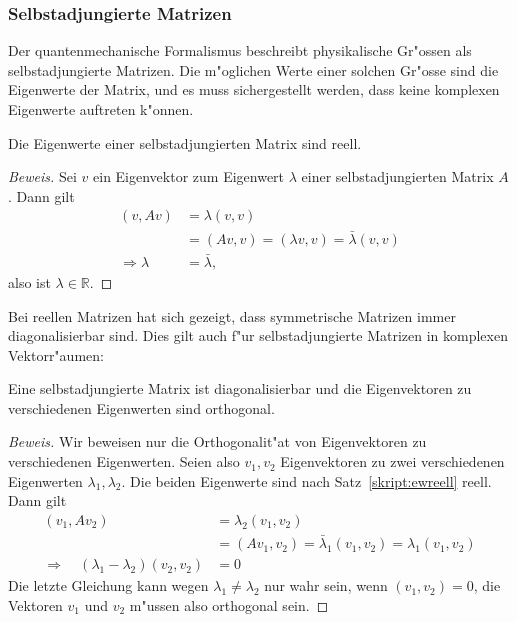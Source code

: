 \subsubsection{Selbstadjungierte Matrizen}
Der quantenmechanische Formalismus beschreibt physikalische Gr"ossen
als selbstadjungierte Matrizen. Die m"oglichen Werte einer solchen Gr"osse
sind die Eigenwerte der Matrix, und es muss sichergestellt werden,
dass keine komplexen Eigenwerte auftreten k"onnen.

\begin{satz}
\label{skript:ewreell}
Die Eigenwerte einer selbstadjungierten Matrix sind reell.
\end{satz}
\begin{proof}[Beweis]
Sei $v$ ein Eigenvektor zum Eigenwert $\lambda$ einer selbstadjungierten
Matrix $A$. Dann gilt
\begin{align*}
(v,Av)
&=
\lambda(v,v)
\\
&=(Av,v)=(\lambda v,v)=\bar\lambda(v,v)
\\
\Rightarrow \lambda&=\bar\lambda,
\end{align*}
also ist $\lambda\in\mathbb R$.
\end{proof}

Bei reellen Matrizen hat sich gezeigt, dass symmetrische Matrizen immer
diagonalisierbar sind. Dies gilt auch f"ur selbstadjungierte Matrizen
in komplexen Vektorr"aumen:

\begin{satz}
\label{skript:evorthogonal}
Eine selbstadjungierte Matrix ist diagonalisierbar und die Eigenvektoren zu
verschiedenen Eigenwerten sind orthogonal.
\end{satz}

\begin{proof}[Beweis]
Wir beweisen nur die Orthogonalit"at von Eigenvektoren zu verschiedenen 
Eigenwerten. Seien also $v_1,v_2$ Eigenvektoren zu zwei verschiedenen
Eigenwerten $\lambda_1,\lambda_2$. Die beiden Eigenwerte sind nach
Satz~\ref{skript:ewreell} reell. Dann gilt
\begin{align*}
(v_1,Av_2)&=\lambda_2(v_1,v_2)
\\
          &=(Av_1,v_2)=\bar\lambda_1(v_1,v_2)=\lambda_1(v_1,v_2)
\\
\Rightarrow\quad
(\lambda_1-\lambda_2)(v_2,v_2)&=0
\end{align*}
Die letzte Gleichung kann wegen $\lambda_1\ne\lambda_2$ nur wahr sein,
wenn $(v_1,v_2)=0$, die Vektoren $v_1$ und $v_2$ m"ussen also orthogonal sein.
\end{proof}

